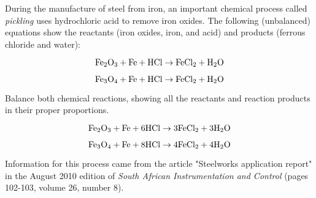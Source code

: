 

During the manufacture of steel from iron, an important chemical process called {\it pickling} uses hydrochloric acid to remove iron oxides.  The following (unbalanced) equations show the reactants (iron oxides, iron, and acid) and products (ferrous chloride and water):

$$\hbox{Fe}_2\hbox{O}_3 + \hbox{Fe} + \hbox{HCl} \to \hbox{FeCl}_2 + \hbox{H}_2\hbox{O}$$

$$\hbox{Fe}_3\hbox{O}_4 + \hbox{Fe} + \hbox{HCl} \to \hbox{FeCl}_2 + \hbox{H}_2\hbox{O}$$

Balance both chemical reactions, showing all the reactants and reaction products in their proper proportions.







$$\hbox{Fe}_2\hbox{O}_3 + \hbox{Fe} + 6\hbox{HCl} \to 3\hbox{FeCl}_2 + 3\hbox{H}_2\hbox{O}$$

$$\hbox{Fe}_3\hbox{O}_4 + \hbox{Fe} + 8\hbox{HCl} \to 4\hbox{FeCl}_2 + 4\hbox{H}_2\hbox{O}$$







Information for this process came from the article "Steelworks application report" in the August 2010 edition of {\it South African Instrumentation and Control} (pages 102-103, volume 26, number 8).




